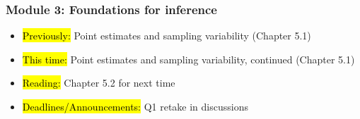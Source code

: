 
\begin{frame}
    \frametitle{Module 3: Foundations for inference}
    \begin{itemize}
        \item \hl{Previously: }Point estimates and sampling variability (Chapter 5.1)
        \item \hl{This time: }Point estimates and sampling variability, continued (Chapter 5.1)
        \item \hl{Reading: }Chapter 5.2 for next time
        \item \hl{Deadlines/Announcements: }Q1 retake in discussions
    \end{itemize}
    
\end{frame}
    